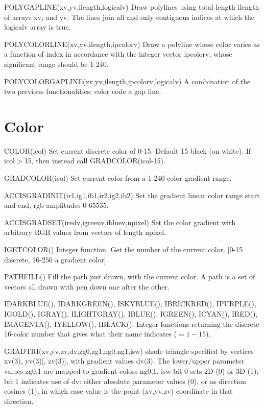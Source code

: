 \documentclass[12pt]{article}
\newif \iftth
\begin{document}
POLYGAPLINE(xv,yv,ilength,logicalv) Draw polylines using total
length ilength of arrays xv, and yv. The lines join all and only
contiguous indices at which the logicalv array is true.

POLYCOLORLINE(xv,yv,ilength,ipcolorv) Draw a polyline whose color
varies as a function of index in accordance with the integer vector
ipcolorv, whose significant range should be 1-240.

POLYCOLORGAPLINE(xv,yv,ilength,ipcolorv,logicalv) A combination of the
two previous functionalities; color code a gap line.

\section{Color}

\iftth \special{html:<a href="filltest.f"><img align="right" src="filltest.png"></a>}\fi
COLOR(icol) Set current discrete color of 0-15. Default 15 black (on
white). If icol$>$15, then instead call GRADCOLOR(icol-15).

GRADCOLOR(icol) Set current color from a 1-240 color gradient range.

ACCISGRADINIT(ir1,ig1,ib1,ir2,ig2,ib2) Set the gradient linear color
range start and end, rgb amplitudes 0-65535.

ACCISGRADSET(iredv,igreenv,ibluev,npixel) Set the color gradient with
arbitrary RGB values from vectors of length npixel.

IGETCOLOR() Integer function.  Get the number of the current
color. [0-15 discrete, 16-256 a gradient color].

PATHFILL() Fill the path just drawn, with the current color. A path is
a set of vectors all drawn with pen down one after the other.

IDARKBLUE(), IDARKGREEN(),  ISKYBLUE(),  IBRICKRED(),  IPURPLE(),
IGOLD(),  IGRAY(),  ILIGHTGRAY(),  IBLUE(),  IGREEN(),  ICYAN(),
IRED(),  IMAGENTA(),  IYELLOW(),  IBLACK(): Integer functions returning
the discrete 16-color number that gives what their name indicates ($=1-15$).

GRADTRI(xv,yv,zv,dv,zg0,zg1,ng0,ng1,isw) shade triangle specified by
vertices xv(3), yv(3)[, zv(3)], with gradient values dv(3). The
lower/upper parameter values zg0,1 are mapped to gradient colors
ng0,1. isw bit 0 sets 2D (0) or 3D (1); bit 1 indicates use of dv:
either absolute parameter values (0), or as direction cosines (1), in
which case value is the point (xv,yv,zv) coordinate in that direction.
\end{document}

